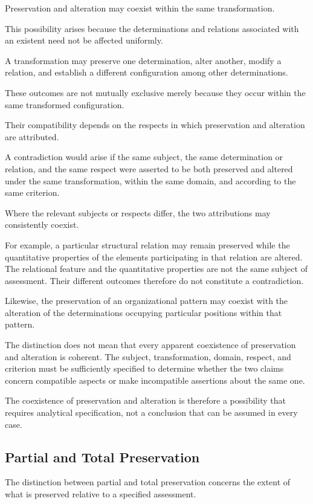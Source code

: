 Preservation and alteration may coexist within the
same transformation.

This possibility arises because the determinations
and relations associated with an existent need not
be affected uniformly.

A transformation may preserve one determination,
alter another, modify a relation, and establish a
different configuration among other determinations.

These outcomes are not mutually exclusive merely
because they occur within the same transformed
configuration.

Their compatibility depends on the respects in
which preservation and alteration are attributed.

A contradiction would arise if the same subject,
the same determination or relation, and the same
respect were asserted to be both preserved and altered
under the same transformation, within the same domain,
and according to the same criterion.

Where the relevant subjects or respects differ,
the two attributions may consistently coexist.

For example, a particular structural relation may
remain preserved while the quantitative properties
of the elements participating in that relation are
altered. The relational feature and the quantitative
properties are not the same subject of assessment.
Their different outcomes therefore do not constitute
a contradiction.

Likewise, the preservation of an organizational
pattern may coexist with the alteration of the
determinations occupying particular positions within
that pattern.

The distinction does not mean that every apparent
coexistence of preservation and alteration is coherent.
The subject, transformation, domain, respect, and
criterion must be sufficiently specified to determine
whether the two claims concern compatible aspects
or make incompatible assertions about the same one.

The coexistence of preservation and alteration is
therefore a possibility that requires analytical
specification, not a conclusion that can be assumed
in every case.

\subsection{Partial and Total Preservation}

The distinction between partial and total preservation
concerns the extent of what is preserved relative to
a specified assessment.

